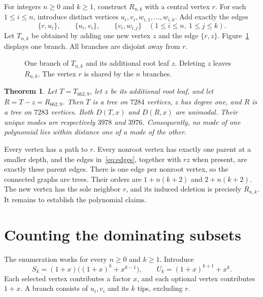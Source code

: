 \documentclass[11pt]{article}
\newtheorem{theorem}{Theorem}
\newcommand{\D}{D}
\begin{document}
For integers $n\ge0$ and $k\ge1$, construct $R_{n,k}$ with a central vertex $r$. For each $1\le i\le n$, introduce distinct vertices $u_i,v_i,w_{i,1},\ldots,w_{i,k}$. Add exactly the edges
\begin{equation}\label{eq:edges}
 \{r,u_i\},\qquad \{u_i,v_i\},\qquad
 \{v_i,w_{i,j}\}\quad(1\le i\le n,\ 1\le j\le k).
\end{equation}
Let $T_{n,k}$ be obtained by adding one new vertex $z$ and the edge $\{r,z\}$. Figure~\ref{fig:branch} displays one branch. All branches are disjoint away from $r$.

\begin{figure}[ht]
\centering
{}
\caption{One branch of $T_{n,k}$ and its additional root leaf $z$. Deleting $z$ leaves $R_{n,k}$. The vertex $r$ is shared by the $n$ branches.}\label{fig:branch}
\end{figure}

\begin{theorem}\label{thm:main}
Let $T=T_{662,9}$, let $z$ be its additional root leaf, and let $R=T-z=R_{662,9}$. Then $T$ is a tree on $7284$ vertices, $z$ has degree one, and $R$ is a tree on $7283$ vertices. Both $\D(T,x)$ and $\D(R,x)$ are unimodal. Their unique modes are respectively $3978$ and $3976$. Consequently, no mode of one polynomial lies within distance one of a mode of the other.
\end{theorem}

Every vertex has a path to $r$. Every nonroot vertex has exactly one parent at a smaller depth, and the edges in~\eqref{eq:edges}, together with $rz$ when present, are exactly these parent edges. There is one edge per nonroot vertex, so the connected graphs are trees. Their orders are $1+n(k+2)$ and $2+n(k+2)$. The new vertex has the sole neighbor $r$, and its induced deletion is precisely $R_{n,k}$. It remains to establish the polynomial claims.

\section{Counting the dominating subsets}
The enumeration works for every $n\ge0$ and $k\ge1$. Introduce
\begin{equation}\label{eq:SU}
 S_k=(1+x)\bigl((1+x)^k+x^{k-1}\bigr),\qquad
 U_k=(1+x)^{k+1}+x^k.
\end{equation}
Each selected vertex contributes a factor $x$, and each optional vertex contributes $1+x$. A branch consists of $u_i,v_i$ and its $k$ tips, excluding $r$.
\end{document}
